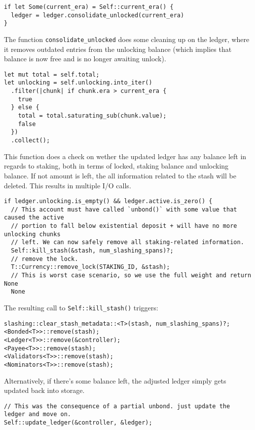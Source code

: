 \documentclass[11pt,a4paper]{article}
\begin{document}
\begin{verbatim}
if let Some(current_era) = Self::current_era() {
  ledger = ledger.consolidate_unlocked(current_era)
}
\end{verbatim}

The function \verb|consolidate_unlocked| does some cleaning up on the ledger, where
it removes outdated entries from the unlocking balance (which implies that
balance is now free and is no longer awaiting unlock).

\begin{verbatim}
let mut total = self.total;
let unlocking = self.unlocking.into_iter()
  .filter(|chunk| if chunk.era > current_era {
    true
  } else {
    total = total.saturating_sub(chunk.value);
    false
  })
  .collect();
\end{verbatim}

This function does a check on wether the updated ledger has any balance left in
regards to staking, both in terms of locked, staking balance and unlocking balance.
If not amount is left, the all information related to the stash will be deleted.
This results in multiple I/O calls.

\begin{verbatim}
if ledger.unlocking.is_empty() && ledger.active.is_zero() {
  // This account must have called `unbond()` with some value that caused the active
  // portion to fall below existential deposit + will have no more unlocking chunks
  // left. We can now safely remove all staking-related information.
  Self::kill_stash(&stash, num_slashing_spans)?;
  // remove the lock.
  T::Currency::remove_lock(STAKING_ID, &stash);
  // This is worst case scenario, so we use the full weight and return None
  None
\end{verbatim}

The resulting call to \verb|Self::kill_stash()| triggers:

\begin{verbatim}
slashing::clear_stash_metadata::<T>(stash, num_slashing_spans)?;
<Bonded<T>>::remove(stash);
<Ledger<T>>::remove(&controller);
<Payee<T>>::remove(stash);
<Validators<T>>::remove(stash);
<Nominators<T>>::remove(stash);
\end{verbatim}

Alternatively, if there's some balance left, the adjusted ledger simply gets
updated back into storage.

\begin{verbatim}
// This was the consequence of a partial unbond. just update the ledger and move on.
Self::update_ledger(&controller, &ledger);
\end{verbatim}
\end{document}
